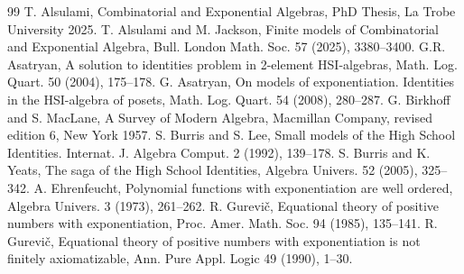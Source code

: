 \documentclass[eqnor,reqno]{amsart}
\theoremstyle{plain}
\theoremstyle{definition}
\begin{document}
\begin{thebibliography}{99}
 T. Alsulami, Combinatorial and Exponential Algebras, PhD Thesis, La Trobe University 2025.
 T. Alsulami and M. Jackson, Finite models of Combinatorial and Exponential Algebra, Bull. London Math. Soc. 57 (2025), 3380--3400.
 G.R. Asatryan, A solution to identities problem in 2-element HSI-algebras, {Math. Log. Quart.}  50 (2004), 175--178.
 G. Asatryan, On models of exponentiation. Identities in the HSI-algebra
of posets,  Math. Log. Quart. 54 (2008), 280--287. 
 G. Birkhoff and S. MacLane, A Survey of Modern Algebra, Macmillan Company, revised edition 6, New York 1957.
 S. Burris and S. Lee, Small models of the High
School Identities. {Internat. J. Algebra Comput.} 2 (1992), 139--178.
 S. Burris and K. Yeats,  The saga of the High
School Identities, {Algebra Univers.} 52 (2005), 325--342.
 A. Ehrenfeucht, Polynomial functions with exponentiation are well ordered, Algebra Univers. 3 (1973), 261--262.
 R. Gurevi\v{c}, Equational theory of positive numbers with exponentiation, {Proc. Amer. Math. Soc.} 94 (1985), 135--141.
 R. Gurevi\v{c}, Equational theory of positive numbers with exponentiation is not finitely axiomatizable, {Ann. Pure Appl. Logic} 49  (1990), 1--30.

\end{thebibliography}
\end{document}
